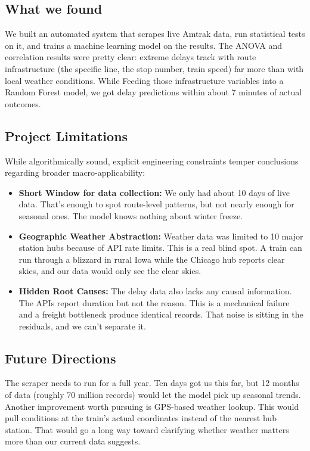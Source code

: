 \documentclass[11pt]{article}
\begin{document}
\subsection{What we found}
We built an automated system that scrapes live Amtrak data, run statistical tests on it, and trains a machine learning model on the results. The ANOVA and correlation results were pretty clear: extreme delays track with route infrastructure (the specific line, the stop number, train speed) far more than with local weather conditions. While Feeding those infrastructure variables into a Random Forest model, we got delay predictions within about 7 minutes of actual outcomes.






\subsection{Project Limitations}
While algorithmically sound, explicit engineering constraints temper conclusions regarding broader macro-applicability:
\begin{itemize}
    \item \textbf{Short Window for data collection:} We only had about 10 days of live data. That’s enough to spot route-level patterns, but not nearly enough for seasonal ones. The model knows nothing about winter freeze.
    \item \textbf{Geographic Weather Abstraction:} Weather data was limited to 10 major station hubs because of API rate limits. This is a real blind spot. A train can run through a blizzard in rural Iowa while the Chicago hub reports clear skies, and our data would only see the clear skies.
    \item \textbf{Hidden Root Causes:} The delay data also lacks any causal information. The APIs report duration but not the reason. This is a mechanical failure and a freight bottleneck produce identical records. That noise is sitting in the residuals, and we can’t separate it.
\end{itemize}

\subsection{Future Directions}
The scraper needs to run for a full year. Ten days got us this far, but 12 months of data (roughly 70 million records) would let the model pick up seasonal trends. Another improvement worth pursuing is GPS-based weather lookup. This would pull conditions at the train’s actual coordinates instead of the nearest hub station. That would go a long way toward clarifying whether weather matters more than our current data suggests.
\end{document}
